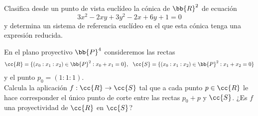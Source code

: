 \documentclass[12pt]{article}
\begin{document}
   \begin{ejercicio}
    Clasifica desde un punto de vista euclídeo la cónica de $\bb{R}^2$ de ecuación
    \[
        3x^2-2xy+3y^2-2x+6y+1=0
    \]
    y determina un sistema de referencia euclídeo en el que esta cónica tenga una expresión reducida.
   \end{ejercicio}

   \begin{ejercicio}
    En el plano proyectivo $\bb{P}^4$ consideremos las rectas
    \begin{gather*}
        \cc{R}=\{(x_0:x_1:x_2)\in \bb{P}^2 : x_0+x_1=0\},\ \ \cc{S}=\{(x_0:x_1:x_2)\in \bb{P}^2: x_1+x_2=0 \}
    \end{gather*}
    y el punto $p_0=(1:1:1)$.\\

    Calcula la aplicación $f:\cc{R} \rightarrow \cc{S}$ tal que a cada punto $p \in \cc{R}$ le hace corresponder el único punto de corte entre las rectas $p_0+p$ y $\cc{S}$.
    ¿Es $f$ una proyectividad de $\cc{R}$ en $\cc{S}$?
   \end{ejercicio}

     
\end{document}
